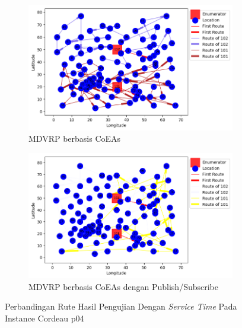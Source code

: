 \begin{figure}[H]
	\centering
	\begin{subfigure}[t]{\textwidth}
		\centering
		\includegraphics[width=\textwidth]{Resources/Images/cordeau_p04_tw/cordeau_p04_tw_coes}
		\caption{MDVRP berbasis CoEAs}
		\label{fig:cordeau_p04_tw_coes}
	\end{subfigure}
	\begin{subfigure}[t]{\textwidth}
		\centering
		\includegraphics[width=\textwidth]{Resources/Images/cordeau_p04_tw/cordeau_p04_tw_pubsub_coes}
		\caption{MDVRP berbasis CoEAs dengan Publish/Subscribe}
		\label{fig:cordeau_p04_tw_pubsub_coes}
	\end{subfigure}
	\caption{Perbandingan Rute Hasil Pengujian Dengan \textit{Service Time} Pada Instance Cordeau p04}
	\label{fig:cordeau_p04_tw}
\end{figure}


